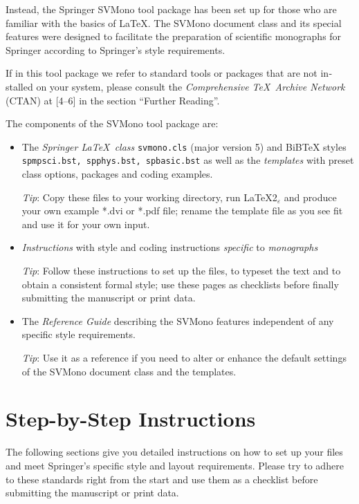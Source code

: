 \documentclass[graybox]{svmono}
\begin{document}
\pagebreak

Instead, the Springer {\sc SVMono} tool package has been set up for those who are familiar with the basics of \LaTeX. The {\sc SVMono} document class and its special features were designed to facilitate the preparation of scientific monographs for Springer according to Springer's style requirements.

If in this tool package we refer to standard tools or packages that are not in­stalled on your system, please consult the {\it Comprehensive \TeX\ Archive Network} (CTAN) at [4--6] in the section ``Further Reading''.

The components of the {\sc SVMono} tool package are:

\begin{itemize}
\item The {\it Springer \LaTeX~class} {\tt svmono.cls} (major version 5) and BiBTeX styles {\tt spmpsci.bst, spphys.bst, spbasic.bst} as well as the {\it templates} with preset class options, packages and coding examples.

{\it Tip}: Copy these files to your working directory, run \LaTeX2$_\varepsilon$ and produce your own example *.dvi or *.pdf file; rename the template file as you see fit and use it for your own input.

\item {\it Instructions} with style and coding instructions {\it specific} to {\it monographs}

{\it Tip}: Follow these instructions to set up the files, to typeset the text and to obtain a consistent formal style; use these pages as checklists before finally submitting the manuscript or print data.

\item The {\it Reference Guide} describing the {\sc SVMono} features independent of any specific style requirements.

{\it Tip}: Use it as a reference if you need to alter or enhance the default settings of the {\sc SVMono} document class and the templates.
\end{itemize}

\section{ Step-by-Step Instructions}

The following sections give you detailed instructions on how to set up your files and meet Springer's specific style and layout requirements. Please try to adhere to these standards right from the start and use them as a checklist before submitting the manuscript or print data.
\end{document}
